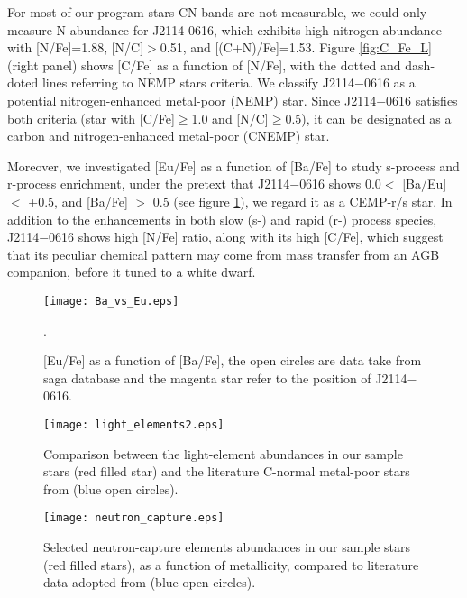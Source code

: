 For most of our program stars CN bands are not measurable,
we could only measure N abundance for J2114-0616, which exhibits high nitrogen abundance with [N/Fe]=1.88, [N/C]$>$0.51, and [(C+N)/Fe]=1.53.  
Figure \ref{fig:C_Fe_L} (right panel) shows [C/Fe] as a function of [N/Fe], with the dotted and dash-doted lines referring to \citet{2012A&A...547A..76P} NEMP stars criteria.
We classify J2114$-$0616 as a potential nitrogen-enhanced metal-poor (NEMP) star.
Since J2114$-$0616 satisfies both criteria (star with [C/Fe]$\geqslant$1.0 and [N/C]$\geqslant$0.5), it can be designated as a 
carbon and nitrogen-enhanced metal-poor (CNEMP) star.  

Moreover, we investigated [Eu/Fe] as a function of [Ba/Fe] to study
s-process and r-process enrichment, under the pretext that J2114$-$0616 shows 0.0$< $ [Ba/Eu] $ <$ +0.5, and [Ba/Fe] $>$ 0.5 (see figure \ref{fig:CEMP}), we regard it as a CEMP-r/s star.
In addition to the enhancements in both slow (s-) and rapid (r-) process species, J2114$-$0616 shows high [N/Fe] ratio, along with its high [C/Fe],
 which suggest that its peculiar chemical pattern may come from mass transfer from an AGB companion, before it tuned to a white dwarf.


 
\vspace{5mm}
\begin{figure}[!ht]
\centering
\texttt{[image: Ba\_vs\_Eu.eps]}
\caption{[Eu/Fe] as a function of [Ba/Fe], the open circles are data take from saga database \citep{2008PASJ...60.1159S} and the magenta star refer to the position of J2114$-$0616. }.
\label{fig:CEMP}
\end{figure}

\vspace{5mm}
\begin{figure}[!ht]
\centering
\texttt{[image: light\_elements2.eps]}
\caption{Comparison between the light-element abundances in our sample stars (red filled star) and the literature C-normal metal-poor stars from \citet{2013ApJ...762...26Y}  (blue open circles).}
\label{fig:light_Fe}
\end{figure}

\vspace{5mm}
\begin{figure}[!ht]
\centering
\texttt{[image: neutron\_capture.eps]}
\caption{Selected neutron-capture elements abundances in our sample stars (red filled stars), as a function of metallicity, compared to literature data adopted from \citet{2007A&A...476..935F} (blue open circles).}
\label{fig:heavy_Fe}
\end{figure}

